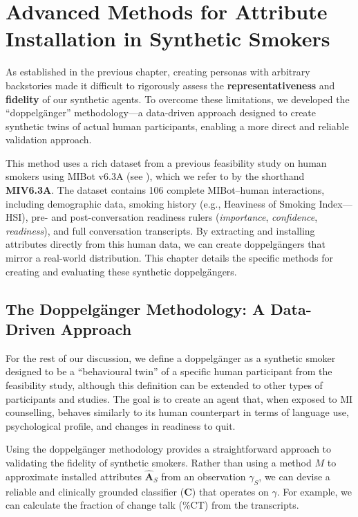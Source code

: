 \chapter{Advanced Methods for Attribute Installation in Synthetic Smokers}
\label{ch:synthetic-doppelganger}

As established in the previous chapter, creating personas with arbitrary backstories made it difficult to rigorously assess the \textbf{representativeness} and \textbf{fidelity} of our synthetic agents. To overcome these limitations, we developed the ``doppelgänger'' methodology—a data-driven approach designed to create synthetic twins of actual human participants, enabling a more direct and reliable validation approach.

This method uses a rich dataset from a previous feasibility study on human smokers using MIBot v6.3A (see ), which we refer to by the shorthand \textbf{MIV6.3A}. The dataset contains 106 complete MIBot--human interactions, including demographic data, smoking history (e.g., Heaviness of Smoking Index---HSI), pre- and post-conversation readiness rulers (\emph{importance}, \emph{confidence}, \emph{readiness}), and full conversation transcripts. By extracting and installing attributes directly from this human data, we can create doppelgängers that mirror a real-world distribution. This chapter details the specific methods for creating and evaluating these synthetic doppelgängers.

\section{The Doppelgänger Methodology: A Data-Driven Approach}
\label{sec:synthetic-smoker-doppelgänger}

For the rest of our discussion, we define a doppelgänger as a synthetic smoker designed to be a ``behavioural twin'' of a specific human participant from the feasibility study, although this definition can be extended to other types of participants and studies. The goal is to create an agent that, when exposed to MI counselling, behaves similarly to its human counterpart in terms of language use, psychological profile, and changes in readiness to quit.

Using the doppelgänger methodology provides a straightforward approach to validating the fidelity of synthetic smokers. Rather than using a method $M$ to approximate installed attributes $\hat{\textbf{A}}_S$ from an observation $\gamma_S$, we can devise a reliable and clinically grounded classifier ($\textbf{C}$) that operates on $\gamma$. For example, we can calculate the fraction of change talk (\%CT) from the transcripts.


